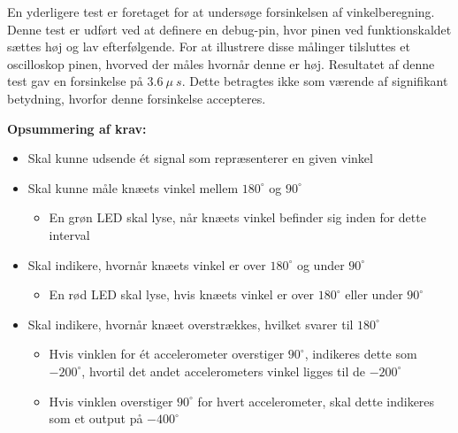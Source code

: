 \noindent
En yderligere test er foretaget for at undersøge forsinkelsen af vinkelberegning. Denne test er udført ved at definere en debug-pin, hvor pinen ved funktionskaldet sættes høj og lav efterfølgende. For at illustrere disse målinger tilsluttes et oscilloskop pinen, hvorved der måles hvornår denne er høj. Resultatet af denne test gav en forsinkelse på  $3.6~\mu~s$. Dette betragtes ikke som værende af signifikant betydning, hvorfor denne forsinkelse accepteres.


\vspace{3mm}
\textbf{Opsummering af krav:}
\begin{itemize}
\item[\text{\sffamily \checkmark}] Skal kunne udsende ét signal som repræsenterer en given vinkel
\item[\text{\sffamily \checkmark}] Skal kunne måle knæets vinkel mellem $180^{\circ}$ og $90^{\circ}$
\begin{itemize}
\item En grøn LED skal lyse, når knæets vinkel befinder sig inden for dette interval
\end{itemize}
\item[\text{\sffamily \checkmark}] Skal indikere, hvornår knæets vinkel er over $180^{\circ}$ og under $90^{\circ}$
\begin{itemize}
\item En rød LED skal lyse, hvis knæets vinkel er over $180^{\circ}$ eller under $90^{\circ}$
\end{itemize}
\item[\text{\sffamily \checkmark}] Skal indikere, hvornår knæet overstrækkes, hvilket svarer til $180^{\circ}$
\begin{itemize}
\item Hvis vinklen for ét accelerometer overstiger $90^{\circ}$, indikeres dette som $-200^{\circ}$, hvortil det andet accelerometers vinkel ligges til de $-200^{\circ}$
\item Hvis vinklen overstiger $90^{\circ}$ for hvert accelerometer, skal dette indikeres som et output på $-400^{\circ}$
\end{itemize}
\end{itemize}